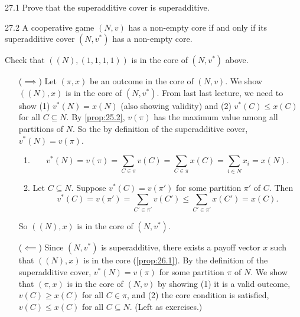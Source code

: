 \documentclass[12pt,letterpaper]{report}
\begin{document}
\begin{exer}{}{27.1}
  Prove that the superadditive cover is superadditive.
\end{exer}

\begin{prop}{}{27.2}
  A cooperative game $(N, v)$ has a non-empty core if and only if its superadditive cover $(N, v^*)$
  has a non-empty core.
\end{prop}

\begin{ex}
  Check that $((N), (1, 1, 1, 1))$ is in the core of $(N, v^*)$ above.
\end{ex}

\begin{thmproof}
  \begin{itemize}[leftmargin=4em]
    \item[($\implies$)]
    Let $(\pi, x)$ be an outcome in the core of $(N, v)$.
    We show $((N), x)$ is in the core of $(N, v^*)$.
    From last last lecture, we need to show (1) $v^*(N) = x(N)$ (also showing validity) and (2)
    $v^*(C) \leq x(C)$ for all $C \subseteq N$.
    By \cref{prop:25.2}, $v(\pi)$ has the maximum value among all partitions of $N$.
    So the by definition of the superadditive cover, $v^*(N) = v(\pi)$.
    \begin{enumerate}[label=(\arabic*)]
      \item
      \[
        v^*(N) = v(\pi) = \sum_{C \in \pi} v(C) = \sum_{C \in \pi} x(C) = \sum_{i \in N} x_i = x(N).
      \]
      \item
      Let $C \subseteq N$.
      Suppose $v^*(C) = v(\pi')$ for some partition $\pi'$ of $C$.
      Then
      \[
        v^*(C) = v(\pi') = \sum_{C' \in \pi'} v(C') \leq \sum_{C' \in \pi'} x(C') = x(C).
      \]
    \end{enumerate}
    So $((N), x)$ is in the core of $(N, v^*)$.

    \item[($\impliedby$)]
    Since $(N, v^*)$ is superadditive, there exists a payoff vector $x$ such that $((N), x)$ is in
    the core (\cref{prop:26.1}).
    By the definition of the superadditive cover, $v^*(N) = v(\pi)$ for some partition $\pi$ of $N$.
    We show that $(\pi, x)$ is in the core of $(N, v)$ by showing (1) it is a valid outcome,
    $v(C) \geq x(C)$ for all $C \in \pi$, and (2) the core condition is satisfied, $v(C) \leq x(C)$
    for all $C \subseteq N$.
    (Left as exercises.)
  \end{itemize}
\end{thmproof}
\end{document}
